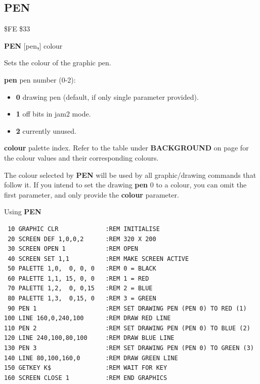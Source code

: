 \subsection{PEN}
\begin{description}[leftmargin=2cm,style=nextline]
\item [Token:] \$FE \$33
\item [Format:] {\bf PEN} [pen{\bf,}] colour
\item [Usage:]  Sets the colour of the graphic pen.

                {\bf pen} pen number (0-2):
                \begin{itemize}
                    \item {\bf 0} drawing pen (default, if only single parameter provided).
                    \item {\bf 1} off bits in jam2 mode.
                    \item {\bf 2} currently unused.
                \end{itemize}

                {\bf colour} palette index. Refer to the table under {\bf BACKGROUND} on
                page \pageref{colourtable} for the colour values and their corresponding colours.

\item [Remarks:] The colour selected by {\bf PEN} will be used by all
                 graphic/drawing commands that follow it.
                 If you intend to set the drawing {\bf pen} 0 to a colour, you can
                 omit the first parameter, and only provide the {\bf colour} parameter.

\item [Example:] Using {\bf PEN}

\begin{tcolorbox}[colback=black,coltext=white]
\verbatimfont{\codefont}
\begin{verbatim}
 10 GRAPHIC CLR             :REM INITIALISE
 20 SCREEN DEF 1,0,0,2      :REM 320 X 200
 30 SCREEN OPEN 1           :REM OPEN
 40 SCREEN SET 1,1          :REM MAKE SCREEN ACTIVE
 50 PALETTE 1,0,  0, 0, 0   :REM 0 = BLACK
 60 PALETTE 1,1, 15, 0, 0   :REM 1 = RED
 70 PALETTE 1,2,  0, 0,15   :REM 2 = BLUE
 80 PALETTE 1,3,  0,15, 0   :REM 3 = GREEN
 90 PEN 1                   :REM SET DRAWING PEN (PEN 0) TO RED (1)
100 LINE 160,0,240,100      :REM DRAW RED LINE
110 PEN 2                   :REM SET DRAWING PEN (PEN 0) TO BLUE (2)
120 LINE 240,100,80,100     :REM DRAW BLUE LINE
130 PEN 3                   :REM SET DRAWING PEN (PEN 0) TO GREEN (3)
140 LINE 80,100,160,0       :REM DRAW GREEN LINE
150 GETKEY K$               :REM WAIT FOR KEY
160 SCREEN CLOSE 1          :REM END GRAPHICS
\end{verbatim}
\end{tcolorbox}
\end{description}



